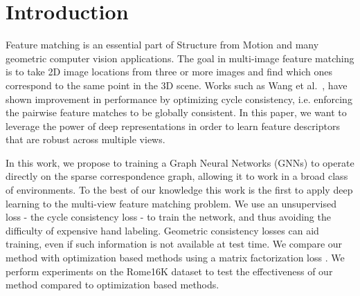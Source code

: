\documentclass[10pt,twocolumn,letterpaper]{article}
\begin{document}
\section{Introduction}
Feature matching is an essential part of Structure from Motion and many geometric computer vision applications.
The goal in multi-image feature matching is to take 2D image locations from three or more images and find which ones correspond to the same point in the 3D scene.
Works such as Wang et al.~\cite{wang2017multi}, have shown improvement in performance by optimizing cycle consistency, i.e. enforcing the pairwise feature matches to be globally consistent.
In this paper, we want to leverage the power of deep representations in order to learn feature descriptors that are robust across multiple views.


In this work, we propose to training a Graph Neural Networks (GNNs) to operate directly on the sparse correspondence graph, allowing it to work in a broad class of environments.
To the best of our knowledge this work is the first to apply deep learning to the multi-view feature matching problem.
We use an unsupervised loss - the cycle consistency loss - to train the network, and thus avoiding the difficulty of expensive hand labeling.
Geometric consistency losses can aid training, even if such information is not available at test time.
We compare our method with optimization based methods using a matrix factorization loss \cite{zhou2015multi, leonardos2016distributed}.
We perform experiments on the Rome16K \cite{li2010location} dataset to test the effectiveness of our method compared to optimization based methods.
\end{document}
